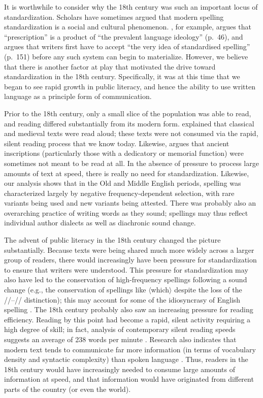\documentclass[doc,biblatex]{apa7}
\newcommand\spelling[1]{\allowbreak$\langle$#1$\rangle$}
\newcommand\pronunciation[1]{/\textdoulos{#1}/}
\begin{document}
It is worthwhile to consider why the 18th century was such an important locus of standardization. Scholars have sometimes argued that modern spelling standardization is a social and cultural phenomenon. \textcite{Sebba:2009}, for example, argues that ``prescription'' is a product of ``the prevalent language ideology'' (p.~46), and \textcite{Cahill:2023} argues that writers first have to accept ``the very idea of standardised spelling'' (p.~151) before any such system can begin to materialize. However, we believe that there is another factor at play that motivated the drive toward standardization in the 18th century. Specifically, it was at this time that we began to see rapid growth in public literacy, and hence the ability to use written language as a principle form of communication.

Prior to the 18th century, only a small slice of the population was able to read, and reading differed substantially from its modern form. \textcite{Saenger:1997} explained that classical and medieval texts were read aloud; these texts were not consumed via the rapid, silent reading process that we know today. Likewise, \textcite{Koller:2024} argues that ancient inscriptions (particularly those with a dedicatory or memorial function) were sometimes not meant to be read at all. In the absence of pressure to process large amounts of text at speed, there is really no need for standardization. Likewise, our analysis shows that in the Old and Middle English periods, spelling was characterized largely by negative frequency-dependent selection, with rare variants being used and new variants being attested. There was probably also an overarching practice of writing words as they sound; spellings may thus reflect individual author dialects as well as diachronic sound change.

The advent of public literacy in the 18th century changed the picture substantially. Because texts were being shared much more widely across a larger group of readers, there would increasingly have been pressure for standardization to ensure that writers were understood. This pressure for standardization may also have led to the conservation of high-frequency spellings following a sound change (e.g., the conservation of spellings like \spelling{which} despite the loss of the \pronunciation{w}--\pronunciation{ʍ} distinction); this may account for some of the idiosyncrasy of English spelling \parencite[see][for discussion]{Berg:2021, CarrRastle:2024}. The 18th century probably also saw an increasing pressure for reading efficiency. Reading by this point had become a rapid, silent activity requiring a high degree of skill; in fact, analysis of contemporary silent reading speeds suggests an average of 238 words per minute \parencite{Brysbaert:2019}. Research also indicates that modern text tends to communicate far more information (in terms of vocabulary density and syntactic complexity) than spoken language \parencite{Nation:2022}. Thus, readers in the 18th century would have increasingly needed to consume large amounts of information at speed, and that information would have originated from different parts of the country (or even the world).
\end{document}
